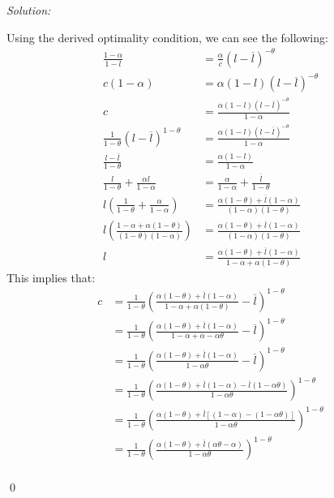 \documentclass[12pt]{article}
\newenvironment{subsol}
    {\emph{Solution:}
    }
    {
    \qed
    }
\begin{document}
\begin{subsol}
    Using the derived optimality condition, we can see the following:
    \begin{align*}
        \frac{1-\alpha}{1-l} &= \frac{\alpha}{c} (l - \overline{l})^{-\theta}\\
        c(1-\alpha) &= \alpha (1- l )(l - \overline{l})^{-\theta}\\
        c &= \frac{\alpha (1-l)(l- \overline{l})^{-\theta}}{1-\alpha}\\
        \frac{1}{1-\theta} (l - \overline{l})^{1-\theta} &= \frac{\alpha (1-l)(l- \overline{l})^{-\theta}}{1-\alpha}\\
        \frac{l - \overline{l}}{1-\theta} &= \frac{\alpha (1-l)}{1-\alpha}\\
        \frac{l}{1-\theta} + \frac{\alpha l}{1-\alpha} &= \frac{\alpha}{1-\alpha} + \frac{\overline{l}}{1-\theta}\\
        l \left( \frac{1}{1-\theta} + \frac{\alpha}{1-\alpha} \right) &= \frac{\alpha (1-\theta) + \overline{l} (1-\alpha)}{(1-\alpha)(1-\theta)}\\
        l \left( \frac{1-\alpha + \alpha(1-\theta)}{(1-\theta)(1-\alpha)} \right) &= \frac{\alpha (1-\theta) + \overline{l} (1-\alpha)}{(1-\alpha)(1-\theta)}\\
        l &= \frac{\alpha (1-\theta) + \overline{l} (1 - \alpha)}{1-\alpha + \alpha(1-\theta)}
    \end{align*}
    This implies that:
    \begin{align*}
        c &= \frac{1}{1 - \theta} \left( \frac{\alpha(1 - \theta) + \overline{l}(1 - \alpha)}{1 - \alpha + \alpha(1 - \theta)} - \overline{l} \right)^{1 - \theta} \\
          &= \frac{1}{1 - \theta} \left( \frac{\alpha(1 - \theta) + \overline{l}(1 - \alpha)}{1 - \alpha + \alpha - \alpha\theta} - \overline{l} \right)^{1 - \theta} \\
          &= \frac{1}{1 - \theta} \left( \frac{\alpha(1 - \theta) + \overline{l}(1 - \alpha)}{1 - \alpha\theta} - \overline{l} \right)^{1 - \theta} \\
          &= \frac{1}{1 - \theta} \left( \frac{\alpha(1 - \theta) + \overline{l}(1 - \alpha) - \overline{l}(1 - \alpha\theta)}{1 - \alpha\theta} \right)^{1 - \theta} \\
          &= \frac{1}{1 - \theta} \left( \frac{\alpha(1 - \theta) + \overline{l}[(1 - \alpha) - (1 - \alpha\theta)]}{1 - \alpha\theta} \right)^{1 - \theta} \\
          &= \frac{1}{1 - \theta} \left( \frac{\alpha(1 - \theta) + \overline{l}(\alpha\theta - \alpha)}{1 - \alpha\theta} \right)^{1 - \theta} \\

\end{align*}
\end{subsol}
\end{document}
